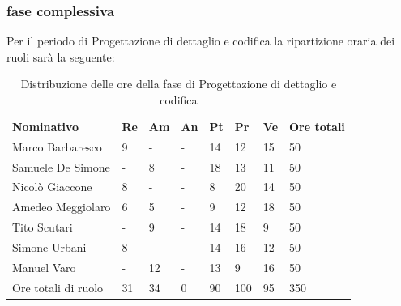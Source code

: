 \subsubsection{fase complessiva}
Per il periodo di Progettazione di dettaglio e codifica la ripartizione oraria dei ruoli sarà la seguente:
\begin{center}
    \begin{table}[ht!]
        \centering
        \caption{Distribuzione delle ore della fase di Progettazione di dettaglio e codifica}
        \vspace{5px}
        \renewcommand{\arraystretch}{1.8}
        \begin{tabular}{p{100px} p{20px} p{20px} p{20px} p{20px} p{20px} p{20px} p{50px} }
            \rowcolor{logo!70} \textbf{Nominativo} & \textbf{Re} & \textbf{Am} & \textbf{An} & \textbf{Pt} & \textbf{Pr} & \textbf{Ve} & \textbf{Ore totali} \\
            Marco Barbaresco                       & 9           & -           & -           & 14          & 12          & 15          & 50                  \\
            Samuele De Simone                      & -           & 8           & -           & 18          & 13          & 11          & 50                  \\
            Nicolò Giaccone                        & 8           & -           & -           & 8           & 20          & 14          & 50                  \\
            Amedeo Meggiolaro                      & 6           & 5           & -           & 9           & 12          & 18          & 50                  \\
            Tito Scutari                           & -           & 9           & -           & 14          & 18          & 9           & 50                  \\
            Simone Urbani                          & 8           & -           & -           & 14          & 16          & 12          & 50                  \\
            Manuel Varo                            & -           & 12          & -           & 13          & 9           & 16          & 50                  \\
            Ore totali di ruolo                    & 31          & 34          & 0           & 90          & 100         & 95          & 350                 \\
        \end{tabular}
    \end{table}
\end{center}
\pagebreak

